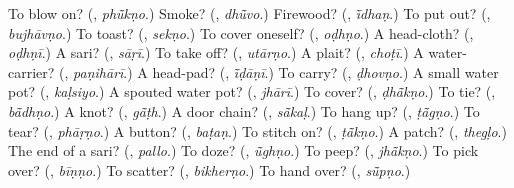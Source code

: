 \begin{tcolorbox}[breakable,colback=teal!4,colframe=teal!35!black,title={Before you move on}]
To blow on? (\textbf{}, \emph{phū̃kṇo}.) Smoke? (\textbf{}, \emph{dhū̃vo}.) Firewood? (\textbf{}, \emph{ī̃dhaṇ}.) To put out? (\textbf{}, \emph{bujhāvṇo}.) To toast? (\textbf{}, \emph{sekṇo}.) To cover oneself? (\textbf{}, \emph{oḍhṇo}.) A head-cloth? (\textbf{}, \emph{oḍhṇī}.) A sari? (\textbf{}, \emph{sāṛī}.) To take off? (\textbf{}, \emph{utārṇo}.) A plait? (\textbf{}, \emph{choṭī}.) A water-carrier? (\textbf{}, \emph{paṇihārī}.) A head-pad? (\textbf{}, \emph{ī̃ḍāṇī}.) To carry? (\textbf{}, \emph{ḍhovṇo}.) A small water pot? (\textbf{}, \emph{kaḷsiyo}.) A spouted water pot? (\textbf{}, \emph{jhārī}.) To cover? (\textbf{}, \emph{ḍhā̃kṇo}.) To tie? (\textbf{}, \emph{bā̃dhṇo}.) A knot? (\textbf{}, \emph{gā̃ṭh}.) A door chain? (\textbf{}, \emph{sā̃kaḷ}.) To hang up? (\textbf{}, \emph{ṭā̃gṇo}.) To tear? (\textbf{}, \emph{phāṛṇo}.) A button? (\textbf{}, \emph{baṭaṇ}.) To stitch on? (\textbf{}, \emph{ṭā̃kṇo}.) A patch? (\textbf{}, \emph{thegḷo}.) The end of a sari? (\textbf{}, \emph{pallo}.) To doze? (\textbf{}, \emph{ū̃ghṇo}.) To peep? (\textbf{}, \emph{jhā̃kṇo}.) To pick over? (\textbf{}, \emph{bīṇṇo}.) To scatter? (\textbf{}, \emph{bikherṇo}.) To hand over? (\textbf{}, \emph{sū̃pṇo}.)
\end{tcolorbox}
